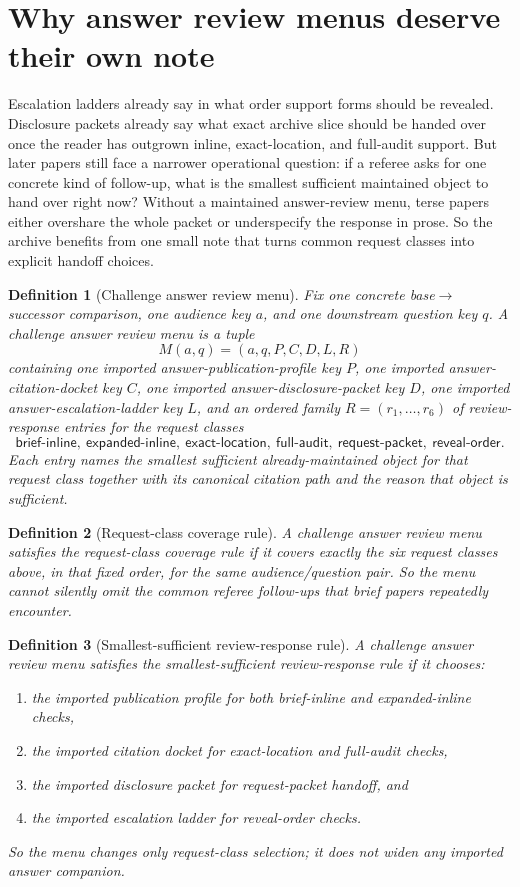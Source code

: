 \documentclass[11pt]{article}
\newtheorem{definition}{Definition}
\begin{document}
\section{Why answer review menus deserve their own note}
Escalation ladders already say in what order support forms should be revealed.
Disclosure packets already say what exact archive slice should be handed over once the reader has outgrown inline, exact-location, and full-audit support.
But later papers still face a narrower operational question: if a referee asks for one concrete kind of follow-up, what is the smallest sufficient maintained object to hand over right now?
Without a maintained answer-review menu, terse papers either overshare the whole packet or underspecify the response in prose.
So the archive benefits from one small note that turns common request classes into explicit handoff choices.

\begin{definition}[Challenge answer review menu]
Fix one concrete base$\to$successor comparison, one audience key $a$, and one downstream question key $q$.
A \emph{challenge answer review menu} is a tuple
\[
M(a,q)=(a,q,P,C,D,L,R)
\]
containing one imported answer-publication-profile key $P$, one imported answer-citation-docket key $C$, one imported answer-disclosure-packet key $D$, one imported answer-escalation-ladder key $L$, and an ordered family $R=(r_1,\dots,r_6)$ of review-response entries for the request classes
\[
\textsf{brief-inline},\ \textsf{expanded-inline},\ \textsf{exact-location},\ \textsf{full-audit},\ \textsf{request-packet},\ \textsf{reveal-order}.
\]
Each entry names the smallest sufficient already-maintained object for that request class together with its canonical citation path and the reason that object is sufficient.
\end{definition}

\begin{definition}[Request-class coverage rule]
A challenge answer review menu satisfies the \emph{request-class coverage rule} if it covers exactly the six request classes above, in that fixed order, for the same audience/question pair.
So the menu cannot silently omit the common referee follow-ups that brief papers repeatedly encounter.
\end{definition}

\begin{definition}[Smallest-sufficient review-response rule]
A challenge answer review menu satisfies the \emph{smallest-sufficient review-response rule} if it chooses:
\begin{enumerate}[leftmargin=*]
\item the imported publication profile for both brief-inline and expanded-inline checks,
\item the imported citation docket for exact-location and full-audit checks,
\item the imported disclosure packet for request-packet handoff, and
\item the imported escalation ladder for reveal-order checks.
\end{enumerate}
So the menu changes only request-class selection; it does not widen any imported answer companion.
\end{definition}
\end{document}
